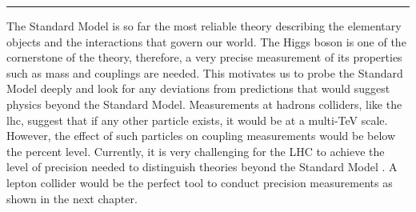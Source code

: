 \begin{center}
  \rule{0.5\textwidth}{.4pt}
\end{center}

The Standard Model is so far the most reliable theory describing the elementary objects and the interactions that govern our world. The Higgs boson is one of the cornerstone of the theory, therefore, a very precise measurement of its properties such as mass and couplings are needed. This motivates us to probe the Standard Model deeply and look for any deviations from predictions that would suggest physics beyond the Standard Model. Measurements at hadrons colliders, like the \acrlong{lhc}, suggest that if any other particle exists, it would be at a multi-TeV scale. However, the effect of such particles on coupling measurements would be below the percent level. Currently, it is very challenging for the LHC to achieve the level of precision needed to distinguish theories beyond the Standard Model \cite{CMS:2013xfa}. A lepton collider would be the perfect tool to conduct precision measurements as shown in the next chapter.
